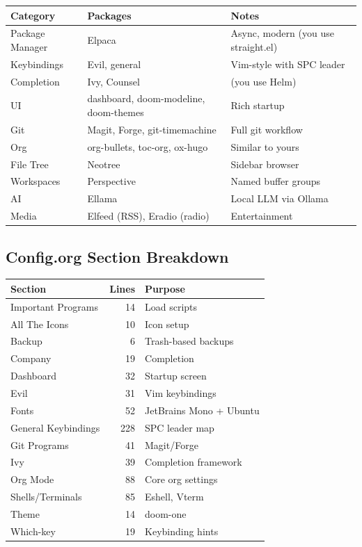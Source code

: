 \documentclass[11pt]{article}
\begin{document}
\begin{center}
\begin{tabular}{lll}
Category & Packages & Notes\\
\hline
Package Manager & Elpaca & Async, modern (you use straight.el)\\
Keybindings & Evil, general & Vim-style with SPC leader\\
Completion & Ivy, Counsel & (you use Helm)\\
UI & dashboard, doom-modeline, doom-themes & Rich startup\\
Git & Magit, Forge, git-timemachine & Full git workflow\\
Org & org-bullets, toc-org, ox-hugo & Similar to yours\\
File Tree & Neotree & Sidebar browser\\
Workspaces & Perspective & Named buffer groups\\
AI & Ellama & Local LLM via Ollama\\
Media & Elfeed (RSS), Eradio (radio) & Entertainment\\
\end{tabular}
\end{center}
\subsection{Config.org Section Breakdown}
\label{sec:orged856c3}

\begin{center}
\begin{tabular}{lrl}
Section & Lines & Purpose\\
\hline
Important Programs & 14 & Load scripts\\
All The Icons & 10 & Icon setup\\
Backup & 6 & Trash-based backups\\
Company & 19 & Completion\\
Dashboard & 32 & Startup screen\\
Evil & 31 & Vim keybindings\\
Fonts & 52 & JetBrains Mono + Ubuntu\\
General Keybindings & 228 & SPC leader map\\
Git Programs & 41 & Magit/Forge\\
Ivy & 39 & Completion framework\\
Org Mode & 88 & Core org settings\\
Shells/Terminals & 85 & Eshell, Vterm\\
Theme & 14 & doom-one\\
Which-key & 19 & Keybinding hints\\
\end{tabular}
\end{center}
\end{document}
